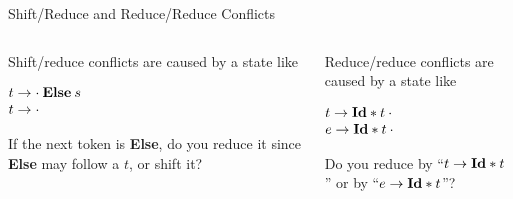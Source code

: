 \documentclass{plt}
\newcommand{\pac}{\cdot}
\begin{document}
\begin{frame}{Shift/Reduce and Reduce/Reduce Conflicts}

\begin{columns}
  \begin{column}{0.5\textwidth}
\raggedright

Shift/reduce conflicts are caused by a state like

\medskip

$\begin{array}{@{}l@{}}
t \rightarrow \pac\> \textbf{Else}\> s \\
t \rightarrow \pac \\
 \end{array}$

\medskip

If the next token is \textbf{Else}, do you reduce it since
\textbf{Else} may follow a $t$, or shift it?
  \end{column}
  \begin{column}{0.5\textwidth}

\raggedright

Reduce/reduce conflicts are caused by a state like

\medskip

$\begin{array}{@{}l@{}}
t \rightarrow \id * t\> \pac \\
e \rightarrow \id * t\> \pac \\
 \end{array}$

\medskip

Do you reduce by ``$t \rightarrow \textbf{Id} * t$'' or by ``$e \rightarrow \textbf{Id} * t$''?

  \end{column}
\end{columns}
\end{frame}


\end{document}
